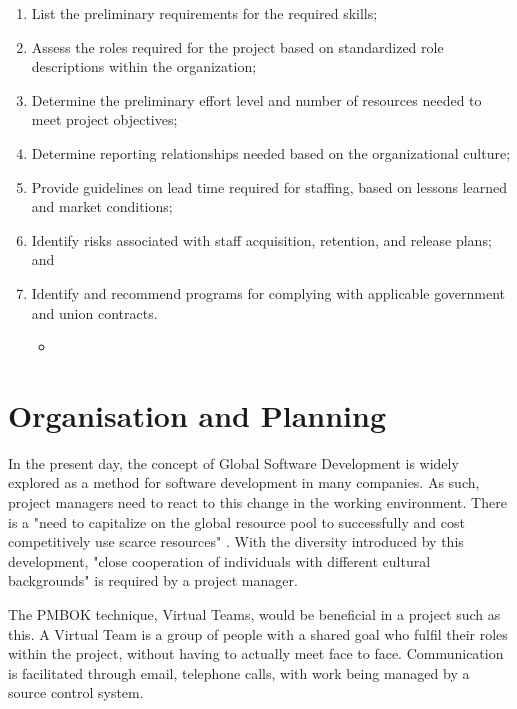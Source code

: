 \begin{enumerate}
\item List the preliminary requirements for the required skills; 
\item Assess the roles required for the project based on standardized role descriptions within the organization;
\item Determine the preliminary effort level and number of resources needed to meet project objectives;
\item Determine reporting relationships needed based on the organizational culture;
\item Provide guidelines on lead time required for staffing, based on lessons learned and market conditions;
\item Identify risks associated with staff acquisition, retention, and release plans; and
\item Identify and recommend programs for complying with applicable government and union contracts.
\begin{itemize}
\item \parencite{pmbok}
\end{itemize}
\end{enumerate}

\section{Organisation and Planning}

In the present day, the concept of Global Software Development is widely explored as a method for software development in many companies. As such, project managers need to react to this change in the working environment. There is a "need to capitalize on the global resource pool to successfully and cost competitively use scarce resources" \parencite{gsd}. With the diversity introduced by this development, "close cooperation of individuals with different cultural backgrounds" \parencite{gsd} is required by a project manager.

The PMBOK technique, Virtual Teams, would be beneficial in a project such as this. A Virtual Team is a group of people with a shared goal who fulfil their roles within the project, without having to actually meet face to face. Communication is facilitated through email, telephone calls, with work being managed by a source control system.



